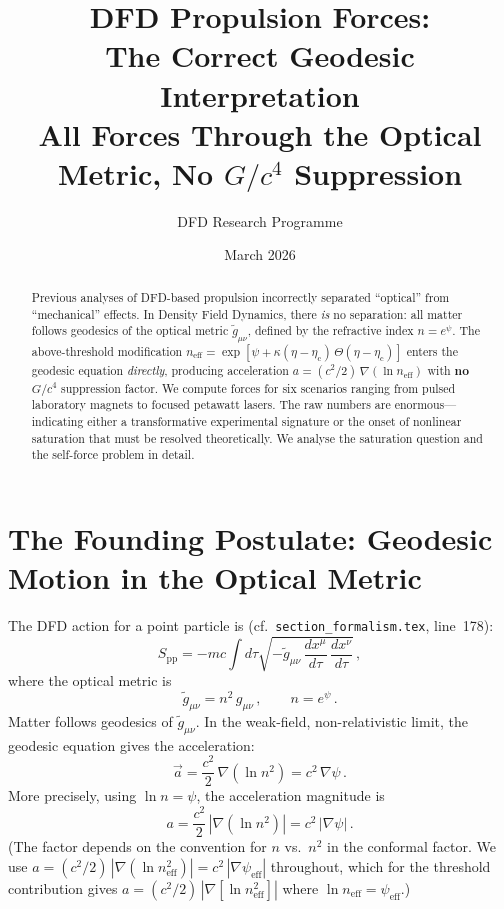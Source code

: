 \documentclass[12pt,a4paper]{article}
\title{DFD Propulsion Forces:\\
The Correct Geodesic Interpretation\\[6pt]
\large All Forces Through the Optical Metric, No $G/c^4$ Suppression}
\author{DFD Research Programme}
\date{March 2026}
\newcommand{\psieff}{\psi_{\mathrm{eff}}}
\newcommand{\neff}{n_{\mathrm{eff}}}
\newcommand{\etac}{\eta_{\mathrm{c}}}
\begin{document}
\maketitle

\begin{abstract}
Previous analyses of DFD-based propulsion incorrectly separated ``optical'' from ``mechanical'' effects.
In Density Field Dynamics, there \emph{is} no separation: all matter follows geodesics of the optical
metric $\tilde{g}_{\mu\nu}$, defined by the refractive index $n = e^\psi$. The above-threshold
modification $\neff = \exp[\psi + \kappa(\eta - \etac)\,\Theta(\eta - \etac)]$ enters the geodesic
equation \emph{directly}, producing acceleration $a = (c^2/2)\,\nabla(\ln \neff)$ with \textbf{no}
$G/c^4$ suppression factor. We compute forces for six scenarios ranging from pulsed laboratory magnets
to focused petawatt lasers. The raw numbers are enormous---indicating either a transformative
experimental signature or the onset of nonlinear saturation that must be resolved theoretically.
We analyse the saturation question and the self-force problem in detail.
\end{abstract}

\tableofcontents
\newpage

\section{The Founding Postulate: Geodesic Motion in the Optical Metric}
\label{sec:postulate}

The DFD action for a point particle is (cf.\ \texttt{section\_formalism.tex}, line~178):
\begin{equation}
\label{eq:Spp}
S_{\mathrm{pp}} = -mc \int d\tau \sqrt{-\tilde{g}_{\mu\nu}\,\frac{dx^\mu}{d\tau}\,\frac{dx^\nu}{d\tau}}\,,
\end{equation}
where the optical metric is
\begin{equation}
\tilde{g}_{\mu\nu} = n^2\, g_{\mu\nu}\,,\qquad n = e^\psi\,.
\end{equation}
Matter follows geodesics of $\tilde{g}_{\mu\nu}$. In the weak-field, non-relativistic limit,
the geodesic equation gives the acceleration:
\begin{equation}
\label{eq:accel}
\boxed{\vec{a} = \frac{c^2}{2}\,\nabla(\ln n^2) = c^2\,\nabla\psi\,.}
\end{equation}
More precisely, using $\ln n = \psi$, the acceleration magnitude is
\begin{equation}
a = \frac{c^2}{2}\,|\nabla(\ln n^2)| = c^2\,|\nabla\psi|\,.
\end{equation}
(The factor depends on the convention for $n$ vs.\ $n^2$ in the conformal factor. We use
$a = (c^2/2)\,|\nabla(\ln \neff^2)| = c^2\,|\nabla\psieff|$ throughout, which for the threshold
contribution gives $a = (c^2/2)\,|\nabla[\ln \neff^2]|$ where $\ln \neff = \psieff$.)
\end{document}

